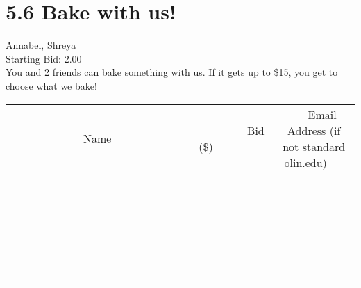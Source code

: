 \documentclass[11pt]{article}
\begin{document}
					\section*{5.6 Bake with us!}
					Annabel, Shreya \\
					Starting Bid: 2.00 \\
					You and 2 friends can bake something with us. If it gets up to \$15, you get to choose what we bake! \\
					[6ex]
					\begin{tabular}{c c c}
						~~~~~~~~~~~~~Name~~~~~~~~~~~~~ & ~~~~~~~~~Bid (\$)~~~~~~~~~ & ~~~Email Address (if not standard olin.edu)~~~ \\
				
 & & \\
\hline
 & & \\
\hline
 & & \\
\hline
 & & \\
\hline
 & & \\
\hline
 & & \\
\hline
 & & \\
\hline
 & & \\
\hline
 & & \\
\hline
 & & \\
\hline
 & & \\
\hline
 & & \\
\hline
 & & \\
\hline
 & & \\
\hline
 & & \\
\hline
 & & \\
\hline
 & & \\
\hline
 & & \\
\hline
 & & \\
\hline
 & & \\
\hline
 & & \\
\hline
 & & \\
\hline
 & & \\
\hline
 & & \\
\hline
 & & \\
\hline
 & & \\
\hline
					\end{tabular}
					\clearpage
				
\end{document}
